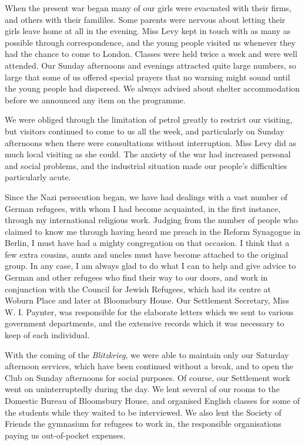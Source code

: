 When the present war began many of our girls were
evacuated with their firms, and others with their famililes.
Some parents were nervous about letting their girls leave
home at all in the evening. Miss Levy kept in touch
with as many as possible through correspondence, and
the young people visited us whenever they had the chance
to come to London. Classes were held twice a week and
were well attended. Our Sunday afternoons and evenings
attracted quite large numbers, so large that some
of us offered special prayers that no warning might sound
until the young people had dispersed. We always advised
about shelter accommodation before we announced any
item on the programme.

We were obliged through the limitation of petrol
greatly to restrict our visiting, but visitors continued to
come to us all the week, and particularly on Sunday
afternoons when there were consultations without interruption.
Miss Levy did as much local visiting as she
could. The anxiety of the war had increased personal
and social problems, and the industrial situation made
our people’s difficulties particularly acute.

Since the Nazi persecution began, we have had dealings
with a vast number of German refugees, with whom
I had become acquainted, in the first instance, through
my international religious work. Judging from the number
of people who claimed to know me through having
heard me preach in the Reform Synagogue in Berlin, I
must have had a mighty congregation on that occasion.
I think that a few extra cousins, aunts and uncles must
have become attached to the original group. In any case,
I am always glad to do what I can to help and give advice
to German and other refugees who find their way to our
doors, and work in conjunction with the Council for
Jewish Refugees, which had its centre at Woburn Place
and later at Bloomsbury House. Our Settlement Secretary,
Miss W. I. Paynter, was responsible for the elaborate
letters which we sent to various government departments,
and the extensive records which it was necessary to keep
of each individual.

With the coming of the \textsl{Blitzkrieg}, we were able to
maintain only our Saturday afternoon services, which
have been continued without a break, and to open the
Club on Sunday afternoons for social purposes. Of course,
our Settlement work went on uninterruptedly during the
day. We lent several of our rooms to the Domestic
Bureau of Bloomsbury House, and organised English
classes for some of the students while they waited to be
interviewed. We also lent the Society of Friends the
gymnasium for refugees to work in, the responsible organisations
paying us out-of-pocket expenses.


